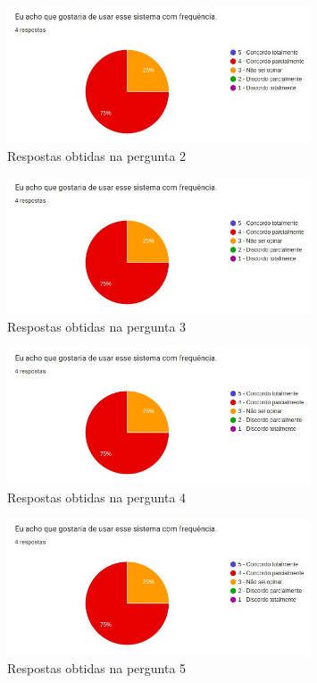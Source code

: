 \documentclass[12pt]{tcc}
\begin{document}
\pagebreak

\begin{figure}[!ht]
	\centering
	\includegraphics[width=0.8\textwidth]{figures/respostas-pergunta-2.jpeg}
	\caption{Respostas obtidas na pergunta 2}
	\label{fig:respostas-pergunta-2}
\end{figure}

\begin{figure}[!ht]
	\centering
	\includegraphics[width=0.8\textwidth]{figures/respostas-pergunta-3.jpeg}
	\caption{Respostas obtidas na pergunta 3}
	\label{fig:respostas-pergunta-3}
\end{figure}

\begin{figure}[!ht]
	\centering
	\includegraphics[width=0.8\textwidth]{figures/respostas-pergunta-4.jpeg}
	\caption{Respostas obtidas na pergunta 4}
	\label{fig:respostas-pergunta-4}
\end{figure}

\begin{figure}[!ht]
	\centering
	\includegraphics[width=0.8\textwidth]{figures/respostas-pergunta-5.jpeg}
	\caption{Respostas obtidas na pergunta 5}
	\label{fig:respostas-pergunta-5}
\end{figure}
\end{document}
